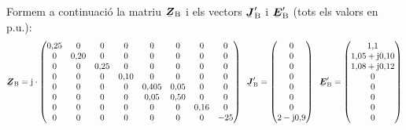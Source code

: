 \begin{exemple}
Formem a continuaci\'{o} la matriu $\mcmplx{Z}\ped{B}$ i els vectors $\mcmplx{J}\ped{B}'$ i $\mcmplx{E}\ped{B}'$ (tots els valors en p.u.):
\[
   \mcmplx{Z}\ped{B} = \ju \cdot
   \begin{pmatrix}
     0{,}25 & 0 & 0 & 0 & 0 & 0 & 0 & 0 \\
     0 & 0{,}20 & 0 & 0 & 0 & 0 & 0 & 0 \\
     0 & 0 & 0{,}25 & 0 & 0 & 0 & 0 & 0 \\
     0 & 0 & 0 & 0{,}10 & 0 & 0 & 0 & 0 \\
     0 & 0 & 0 & 0 & 0{,}405 & 0{,}05 & 0 & 0 \\
     0 & 0 & 0 & 0 & 0{,}05 & 0{,}50 & 0 & 0 \\
     0 & 0 & 0 & 0 & 0 & 0 & 0{,}16 & 0 \\
     0 & 0 & 0 & 0 & 0 & 0 & 0 & -25
   \end{pmatrix}
   \;\;
   \mcmplx{J}\ped{B}' =
   \begin{pmatrix}
    0 \\
    0 \\
    0 \\
    0 \\
    0 \\
    0 \\
    0 \\
    2 - \ju 0{,}9
   \end{pmatrix}
   \;\;
   \mcmplx{E}\ped{B}' =
   \begin{pmatrix}
    1{,}1 \\
    1{,}05 + \ju 0{,}10 \\
    1{,}08 + \ju 0{,}12 \\
    0 \\
    0 \\
    0 \\
    0 \\
    0
   \end{pmatrix}
\]


\end{exemple}
